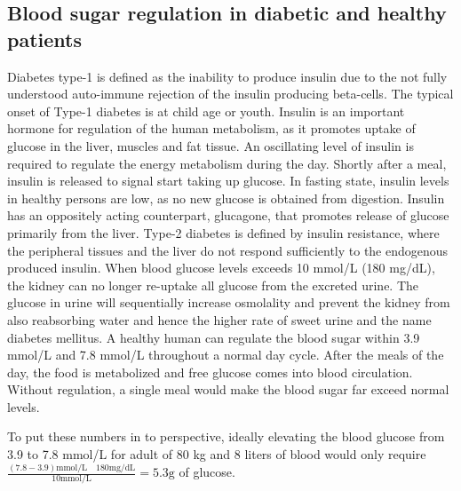\subsection{Blood sugar regulation in diabetic and healthy patients}
Diabetes type-1 is defined as the inability to produce insulin due to the not fully understood auto-immune rejection of the insulin producing beta-cells. The typical onset of Type-1 diabetes is at child age or youth. Insulin is an important hormone for regulation of the human metabolism, as it promotes uptake of glucose in the liver, muscles and fat tissue. An oscillating level of insulin is required to regulate the energy metabolism during the day. Shortly after a meal, insulin is released to signal start taking up glucose. In fasting state, insulin levels in healthy persons are low, as no new glucose is obtained from digestion. Insulin has an oppositely acting counterpart, glucagone, that promotes release of glucose primarily from the liver. Type-2 diabetes is defined by insulin resistance, where the peripheral tissues and the liver do not respond sufficiently to the endogenous produced insulin. When blood glucose levels exceeds 10 mmol/L (180 mg/dL), the kidney can no longer re-uptake all glucose from the excreted urine. The glucose in urine will sequentially increase osmolality and prevent the kidney from also reabsorbing water and hence the higher rate of sweet urine and the name diabetes mellitus. A healthy human can regulate the blood sugar within 3.9 mmol/L and 7.8 mmol/L throughout a normal day cycle. After the meals of the day, the food is metabolized and free glucose comes into blood circulation. Without regulation, a single meal would make the blood sugar far exceed normal levels\cite{silverthorn2010human,Cowart1990}.

To put these numbers in to perspective, ideally elevating the blood glucose from 3.9 to 7.8 mmol/L for adult of 80 kg and 8 liters of blood would only require
$ \frac { (7.8-3.9) \textrm{mmol/L} \quad 180\textrm{mg/dL} }
		{ 10 \textrm{mmol/L} } = 5.3 \textrm{g}$ of glucose.

